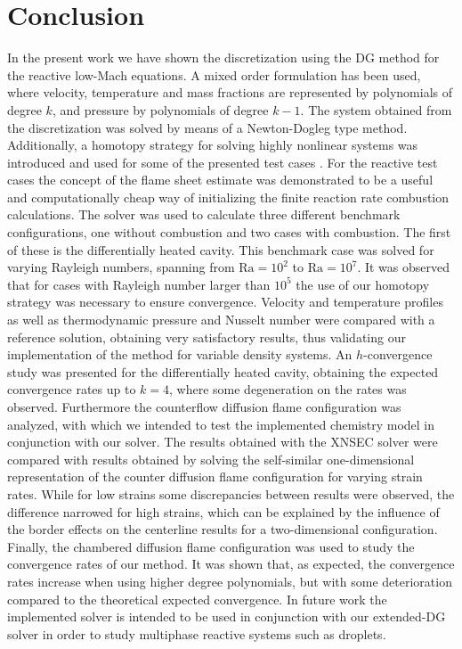 \chapter{Conclusion}	\label{ch:conclusion}
\glsresetall
In the present work we have shown the discretization using the DG method for the reactive low-Mach equations. A mixed order formulation has been used, where velocity, temperature and mass fractions are represented by polynomials of degree $k$, and pressure by polynomials of degree $k-1$. The system obtained from the discretization was solved by means of a Newton-Dogleg type method. Additionally, a homotopy strategy for solving highly nonlinear systems was introduced and used for some of the presented test cases . For the reactive test cases the concept of the flame sheet estimate was demonstrated to be a useful and computationally cheap way of initializing the finite reaction rate combustion calculations.
The solver was used to calculate three different benchmark configurations, one without combustion and two cases with combustion. The first of these is the differentially heated cavity. This benchmark case was solved for varying Rayleigh numbers, spanning from $\text{Ra} = 10^2$ to $\text{Ra} = 10^7$.  It was observed that for cases with Rayleigh number larger than $10^5$ the use of our homotopy strategy was necessary to ensure convergence. Velocity and temperature profiles as well as thermodynamic pressure and Nusselt number were compared with a reference solution, obtaining very satisfactory results, thus validating our implementation of the method for variable density systems. An $h$-convergence study was presented for the differentially heated cavity, obtaining the expected convergence rates up to $k = 4$, where some degeneration on the rates was observed. Furthermore the counterflow diffusion flame configuration was analyzed, with which we intended to test the implemented chemistry model in conjunction with our solver. The results obtained with the XNSEC solver were compared with results obtained by solving the self-similar one-dimensional representation of the counter diffusion flame configuration for varying strain rates. While for low strains some discrepancies between results were observed, the difference narrowed for high strains, which can be explained by the influence of the border effects on the centerline results for a two-dimensional configuration. Finally, the chambered diffusion flame configuration was used to study the convergence rates of our method. It was shown that, as expected, the convergence rates increase when using higher degree polynomials, but with some deterioration compared to the theoretical expected convergence. In future work the implemented solver is intended to be used in conjunction with our extended-DG solver \textcite{kummerExtendedDiscontinuousGalerkin2017,kummerBoSSSPackageMultigrid2021,krauseIncompressibleImmersedBoundary2017}in order to study multiphase reactive systems such as droplets.

